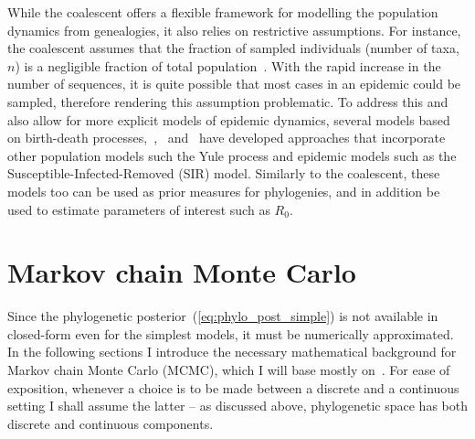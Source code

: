 While the coalescent offers a flexible framework for modelling the population dynamics from genealogies, it also relies on restrictive assumptions.
For instance, the coalescent assumes that the fraction of sampled individuals (number of taxa, $n$) is a negligible fraction of total population~\citep{Fu2006,Volz2009}.
With the rapid increase in the number of sequences, it is quite possible that most cases in an epidemic could be sampled, therefore rendering this assumption problematic.
To address this and also allow for more explicit models of epidemic dynamics, several models based on birth-death processes,~\cite{Volz2009},~\cite{Rasmussen2011} and~\cite{Stadler2011} have developed approaches that incorporate other population models such the Yule process and epidemic models such as the Susceptible-Infected-Removed (SIR) model.
Similarly to the coalescent, these models too can be used as prior measures for phylogenies, and in addition be used to estimate parameters of interest such as $R_0$.

\section{Markov chain Monte Carlo}
\label{sec:mcmc}

Since the phylogenetic posterior~(\ref{eq:phylo_post_simple}) is not available in closed-form even for the simplest models, it must be numerically approximated.
In the following sections I introduce the necessary mathematical background for Markov chain Monte Carlo (MCMC), which I will base mostly on~\cite{Geyer2011}.
For ease of exposition, whenever a choice is to be made between a discrete and a continuous setting I shall assume the latter -- as discussed above, phylogenetic space has both discrete and continuous components.

